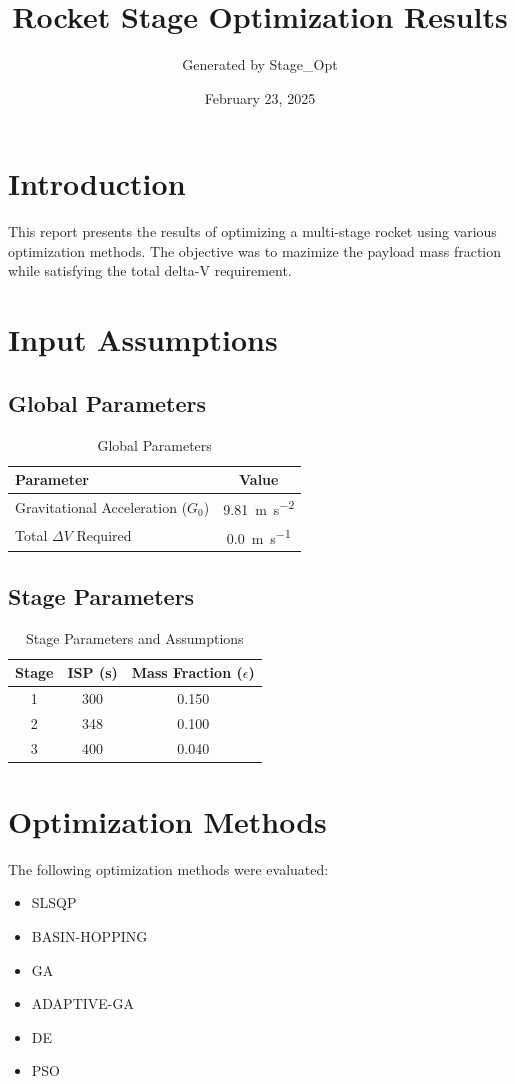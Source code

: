 \documentclass{article}
\title{Rocket Stage Optimization Results}
\author{Generated by Stage\_Opt}
\date{February 23, 2025}
\begin{document}
\maketitle

\section{Introduction}
This report presents the results of optimizing a multi-stage rocket using various optimization methods. The objective was to mazimize the payload mass fraction while satisfying the total delta-V requirement.

\section{Input Assumptions}
\subsection{Global Parameters}
\begin{table}[H]
\centering
\caption{Global Parameters}
\begin{tabular}{lS[table-format=4.2]}
\toprule
Parameter & {Value} \\
\midrule
Gravitational Acceleration ($G_0$) & \SI{9.81}{\meter\per\second\squared} \\
Total $\Delta V$ Required & \SI{0.0}{\meter\per\second} \\
\bottomrule
\end{tabular}
\end{table}

\subsection{Stage Parameters}
\begin{table}[H]
\centering
\caption{Stage Parameters and Assumptions}
\begin{tabular}{cS[table-format=3.0]S[table-format=1.3]}
\toprule
Stage & {ISP (\si{\second})} & {Mass Fraction ($\epsilon$)} \\
 & 300 & 0.150 \\
2 & 348 & 0.100 \\
3 & 400 & 0.040 \\
\bottomrule
\end{tabular}
\end{table}

\section{Optimization Methods}
The following optimization methods were evaluated:
\begin{itemize}
\item SLSQP
\item BASIN-HOPPING
\item GA
\item ADAPTIVE-GA
\item DE
\item PSO
\end{itemize}
\end{document}

